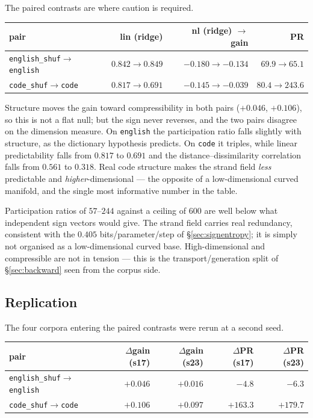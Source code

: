 The paired contrasts are where caution is required.

\begin{center}
\begin{tabular}{lrrr}
\hline
pair & lin (ridge) & nl (ridge) $\to$ gain & PR \\
\hline
\texttt{english\_shuf}$\to$\texttt{english} & $0.842\to0.849$ & $-0.180\to-0.134$ & $69.9\to65.1$ \\
\texttt{code\_shuf}$\to$\texttt{code}       & $0.817\to0.691$ & $-0.145\to-0.039$ & $80.4\to243.6$ \\
\hline
\end{tabular}
\end{center}

Structure moves the gain toward compressibility in both pairs ($+0.046$,
$+0.106$), so this is not a flat null; but the sign never reverses, and the two
pairs disagree on the dimension measure. On \texttt{english} the participation
ratio falls slightly with structure, as the dictionary hypothesis predicts. On
\texttt{code} it triples, while linear predictability falls from $0.817$ to
$0.691$ and the distance--dissimilarity correlation falls from $0.561$ to
$0.318$. Real code structure makes the strand field \emph{less} predictable and
\emph{higher}-dimensional --- the opposite of a low-dimensional curved
manifold, and the single most informative number in the table.

\begin{observation}
\label{obs:structured-not-manifold}
Participation ratios of $57$--$244$ against a ceiling of $600$ are well below
what independent sign vectors would give. The strand field carries real
redundancy, consistent with the $0.405$ bits/parameter/step of
\S\ref{sec:signentropy}; it is simply not organised as a low-dimensional curved
base. High-dimensional and compressible are not in tension --- this is the
transport/generation split of \S\ref{sec:backward} seen from the corpus side.
\end{observation}

\subsection{Replication}
\label{sec:idprobe-repl}

The four corpora entering the paired contrasts were rerun at a second seed.

\begin{center}
\begin{tabular}{lrrrr}
\hline
pair & $\Delta$gain (s17) & $\Delta$gain (s23) & $\Delta$PR (s17) & $\Delta$PR (s23) \\
\hline
\texttt{english\_shuf}$\to$\texttt{english} & $+0.046$ & $+0.016$ & $-4.8$ & $-6.3$ \\
\texttt{code\_shuf}$\to$\texttt{code}       & $+0.106$ & $+0.097$ & $+163.3$ & $+179.7$ \\
\hline
\end{tabular}
\end{center}

